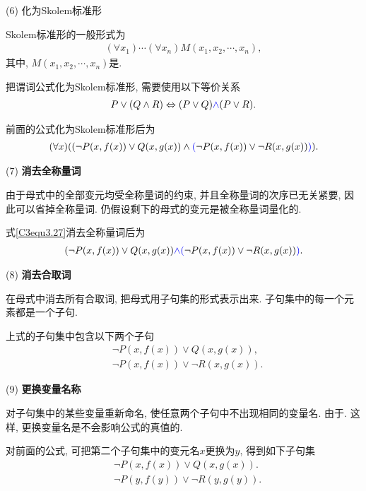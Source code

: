 (6) 化为Skolem标准形

Skolem标准形的一般形式为
\begin{align}
    (\forall x_1)\cdots(\forall x_n) M(x_1,x_2,\cdots,x_n),
\end{align}
其中, $M(x_1,x_2,\cdots,x_n)$是.
\begin{remark}
把谓词公式化为Skolem标准形, 需要使用以下等价关系
\begin{align}
    P\vee (Q\wedge R) \Leftrightarrow  (P\vee Q) \textcolor[rgb]{0,0,1}{\wedge} (P\vee R).
\end{align}
\end{remark}

\begin{example}
前面的公式化为Skolem标准形后为
\begin{align}\label{C3equ3.27}
    (\forall x)((\neg P(x,f(x))\vee Q(x,g(x))\wedge \textcolor[rgb]{0,0,1}{(}\neg P(x,f(x))\vee \neg R(x,g(x))\textcolor[rgb]{0,0,1}{)}).
\end{align}
\end{example}

(7) \textbf{消去全称量词}

由于母式中的全部变元均受全称量词的约束, 并且全称量词的次序已无关紧要, 因此可以省掉全称量词. 仍假设剩下的母式的变元是被全称量词量化的.
\begin{example}
    式\eqref{C3equ3.27}消去全称量词后为
\begin{align}
    (\neg P(x,f(x))\vee Q(x,g(x)) \textcolor[rgb]{0,0,1}{\wedge} \textcolor[rgb]{0,0,1}{(}\neg P(x,f(x))\vee \neg R(x,g(x))\textcolor[rgb]{0,0,1}{)}.
\end{align}
\end{example}

(8) \textbf{消去合取词}

在母式中消去所有合取词, 把母式用子句集的形式表示出来. 子句集中的每一个元素都是一个子句.
\begin{example}
上式的子句集中包含以下两个子句
\begin{align}
  &\neg P(x,f(x))\vee Q(x,g(x)),\\
  &\neg P(x,f(x))\vee \neg R(x,g(x)).
\end{align}
\end{example}

(9) \textbf{更换变量名称}

对子句集中的某些变量重新命名, 使任意两个子句中不出现相同的变量名.
由于. 这样, 更换变量名是不会影响公式的真值的.
\begin{example}
对前面的公式, 可把第二个子句集中的变元名$x$更换为$y$, 得到如下子句集
\begin{align}
  &\neg P(x,f(x))\vee Q(x,g(x)).\\
  &\neg P(y,f(y))\vee \neg R(y,g(y)).
\end{align}
\end{example}
